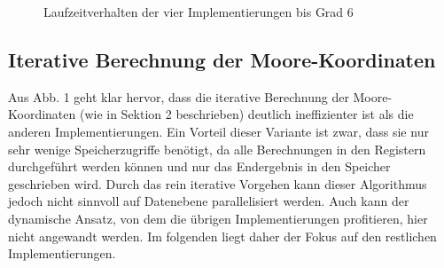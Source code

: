 \documentclass[course=erap]{aspdoc}
\begin{document}
\begin{figure}[htbp] 
    \centering
    \qquad
    \caption{Laufzeitverhalten der vier Implementierungen bis Grad 6}%
    \label{fig:Laufzeitvergleich}%
 \end{figure}
 
 \subsection{Iterative Berechnung der Moore-Koordinaten}
Aus Abb. 1 geht klar hervor, dass die iterative Berechnung der Moore-Koordinaten (wie in Sektion 2 beschrieben) deutlich ineffizienter ist als die anderen Implementierungen. Ein Vorteil dieser Variante ist zwar, dass sie nur sehr wenige Speicherzugriffe benötigt, da alle Berechnungen in den Registern durchgeführt werden können und nur das Endergebnis in den Speicher geschrieben wird. Durch das rein iterative Vorgehen kann dieser Algorithmus jedoch nicht sinnvoll auf Datenebene parallelisiert werden. Auch kann der dynamische Ansatz, von dem die übrigen Implementierungen profitieren, hier nicht angewandt werden. Im folgenden liegt daher der Fokus auf den restlichen Implementierungen.
\end{document}
